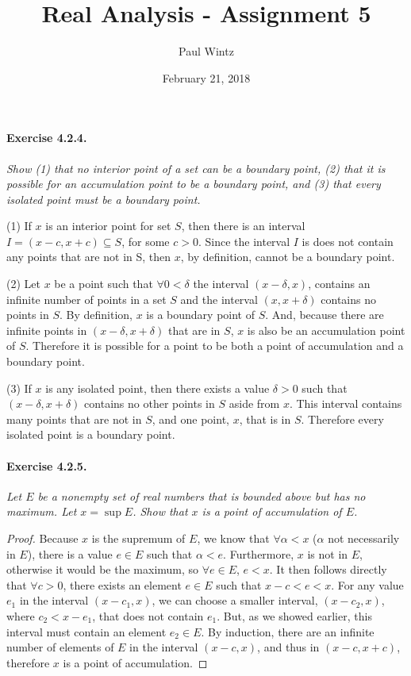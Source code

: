 \documentclass[11pt]{article}
\title{Real Analysis - Assignment 5}
\author{Paul Wintz}
\date{February 21, 2018}
\begin{document}
\maketitle


\paragraph{Exercise 4.2.4.} \textit{Show (1) that no interior point of a set can be a boundary point, (2) that it is possible for an accumulation point to be a boundary point, and (3) that every isolated point must be a boundary point.} \newline

(1) If $x$ is an interior point for set $S$, then there is an interval $I = (x - c, x + c) \subseteq S$, for some $c > 0$. Since the interval $I$ is does not contain any points that are not in S, then $x$, by definition, cannot be a boundary point. \newline

(2) Let $x$ be a point such that $\forall 0 < \delta$ the interval $(x - \delta, x)$, contains an infinite number of points in a set $S$ and the interval $(x, x + \delta)$ contains no points in $S$. By definition, $x$ is a boundary point of $S$. And, because there are infinite points in $(x - \delta, x + \delta)$ that are in $S$, $x$ is also be an accumulation point of $S$. Therefore it is possible for a point to be both a point of accumulation and a boundary point. \newline

(3) If $x$ is any isolated point, then there exists a value $\delta > 0$ such that $(x-\delta, x+\delta)$ contains no other points in $S$ aside from $x$. This interval contains many points that are not in $S$, and one point, $x$, that is in $S$. Therefore every isolated point is a boundary point.

\paragraph{Exercise 4.2.5.} \textit{Let $E$ be a nonempty set of real numbers that is bounded above but has no maximum. Let $x = \sup E$. Show that $x$ is a point of accumulation of $E$.}
	
\begin{proof} Because $x$ is the supremum of $E$, we know that $\forall \alpha < x$ ($\alpha$ not necessarily in $E$), there is a value $e \in E$ such that $\alpha < e$. Furthermore, $x$ is not in $E$, otherwise it would be the maximum, so $\forall e \in E$, $e < x$. It then follows directly that $\forall c > 0$, there exists an element $e \in E$ such that $x - c < e < x$. For any value $e_1$ in the interval $(x - c_1, x)$, we can choose a smaller interval, $(x - c_2, x)$, where $c_2 < x - e_1$, that does not contain $e_1$. But, as we showed earlier, this interval must contain an element $e_2 \in E$. By induction, there are an infinite number of elements of $E$ in the interval $(x - c,  x)$, and thus in $(x - c,  x + c)$, therefore $x$ is a point of accumulation.
\end{proof}
		
\end{document}
